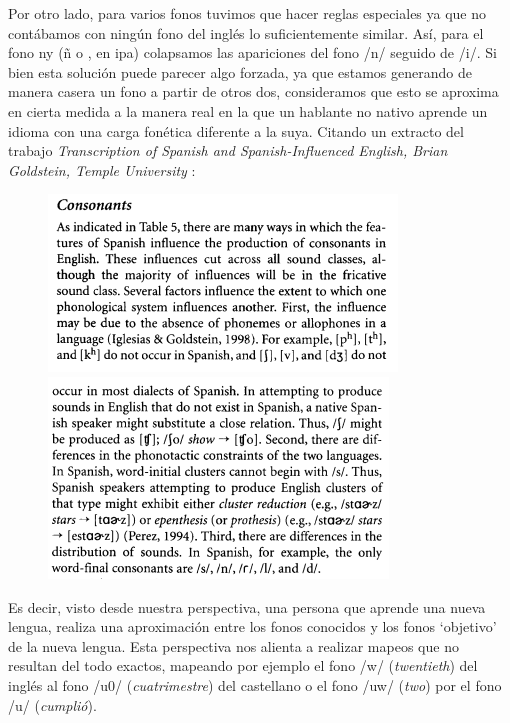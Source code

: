 
Por otro lado, para varios fonos tuvimos que hacer reglas especiales ya que no contábamos con ningún fono del inglés lo suficientemente similar. Así,  para el fono ny (ñ o \textltailn, en ipa) colapsamos las apariciones del fono /n/ seguido de /i/. Si bien esta solución puede parecer algo forzada, ya que estamos generando de manera casera un fono a partir de otros dos, consideramos que esto se aproxima en cierta medida a la manera real en la que un hablante no nativo aprende un idioma con una carga fonética diferente a la suya. Citando un extracto del trabajo \textit{Transcription of Spanish and Spanish-Influenced English, Brian Goldstein, Temple University} \cite{spanishInfluencedEnglish}:

\begin{figure}[H]
\centering
\includegraphics[scale=0.6]{imagenes_investigacion/consonantes1.png}
\includegraphics[scale=0.6]{imagenes_investigacion/consonantes2.png}
\end{figure}

Es decir, visto desde nuestra perspectiva, una persona que aprende una nueva lengua, realiza una aproximación entre los fonos conocidos y los fonos `objetivo' de la nueva lengua. Esta perspectiva nos alienta a realizar mapeos que no resultan del todo exactos, mapeando por ejemplo el fono /w/ (\textit{twentieth}) del inglés al fono /u0/ (\textit{cuatrimestre}) del castellano o el fono /uw/ (\textit{two}) por el fono /u/ (\textit{cumplió}).

